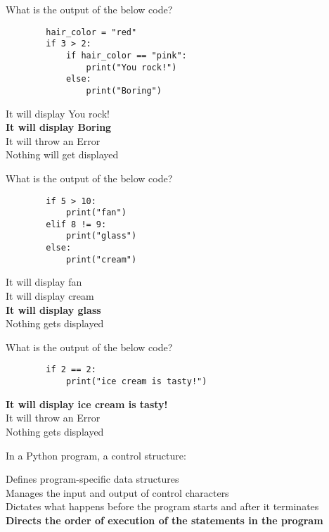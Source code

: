 \documentclass{exam}
\begin{document}
\begin{questions}
    \question What is the output of the below code?

    \begin{verbatim}
        hair_color = "red"
        if 3 > 2:
            if hair_color == "pink":
                print("You rock!")
            else:
                print("Boring")
    \end{verbatim}

    \begin{oneparchoices}
        \choice It will display You rock! \\
        \choice \textbf{It will display Boring} \\
        \choice It will throw an Error \\
        \choice Nothing will get displayed
    \end{oneparchoices}

    \question What is the output of the below code?

    \begin{verbatim}
        if 5 > 10:
            print("fan")
        elif 8 != 9:
            print("glass")
        else:
            print("cream")
    \end{verbatim}

    \begin{oneparchoices}
        \choice It will display fan \\
        \choice It will display cream \\
        \choice \textbf{It will display glass} \\
        \choice Nothing gets displayed
    \end{oneparchoices}

    \question What is the output of the below code?

    \begin{verbatim}
        if 2 == 2:
            print("ice cream is tasty!")
    \end{verbatim}

    \begin{oneparchoices}
        \choice \textbf{It will display ice cream is tasty!} \\
        \choice It will throw an Error \\
        \choice Nothing gets displayed
    \end{oneparchoices}

    \question In a Python program, a control structure:

    \begin{oneparchoices}
        \choice Defines program-specific data structures \\
        \choice Manages the input and output of control characters \\
        \choice Dictates what happens before the program starts and after it terminates \\
        \choice \textbf{Directs the order of execution of the statements in the program}
    \end{oneparchoices}


\end{questions}
\end{document}
